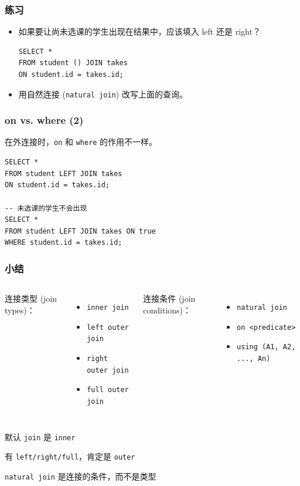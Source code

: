 \documentclass[aspectratio=169, 14pt]{beamer}
\begin{document}
\begin{frame}[fragile]
	\frametitle{练习}
	\begin{itemize}
		\item<1-> {\large {}} 如果要让尚未选课的学生出现在结果中，应该填入 \alert{left} 还是 \alert{right}？
		      \begin{verbatim}
SELECT * 
FROM student () JOIN takes 
ON student.id = takes.id;
    \end{verbatim}
		\item<2-> {\large {}} 用自然连接 (\texttt{natural join}) 改写上面的查询。
	\end{itemize}

\end{frame}

\begin{frame}[fragile]
	\frametitle{on vs. where (2)}
	在外连接时，\texttt{on} 和 \texttt{where} 的作用不一样。

	\begin{verbatim}
SELECT *
FROM student LEFT JOIN takes
ON student.id = takes.id;

-- 未选课的学生不会出现
SELECT *
FROM student LEFT JOIN takes ON true
WHERE student.id = takes.id;
\end{verbatim}

\end{frame}

\begin{frame}
	\frametitle{小结}
	\begin{columns}
		连接类型 (join types)：
		\begin{itemize}
			\item \texttt{inner join}
			\item \texttt{left outer join}
			\item \texttt{right outer join}
			\item \texttt{full outer join}
		\end{itemize}
		连接条件 (join conditions)：
		\begin{itemize}
			\item \texttt{natural join}
			\item \texttt{on <predicate>}
			\item \texttt{using (A1, A2, ..., An)}
		\end{itemize}
	\end{columns}

\end{frame}
{
\begin{frame}[standout]
	默认 \texttt{join} 是 \texttt{inner}

	有 \texttt{left/right/full}，肯定是 \texttt{outer}

	\texttt{natural join} 是连接的条件，而不是类型

\end{frame}
}
\end{document}
